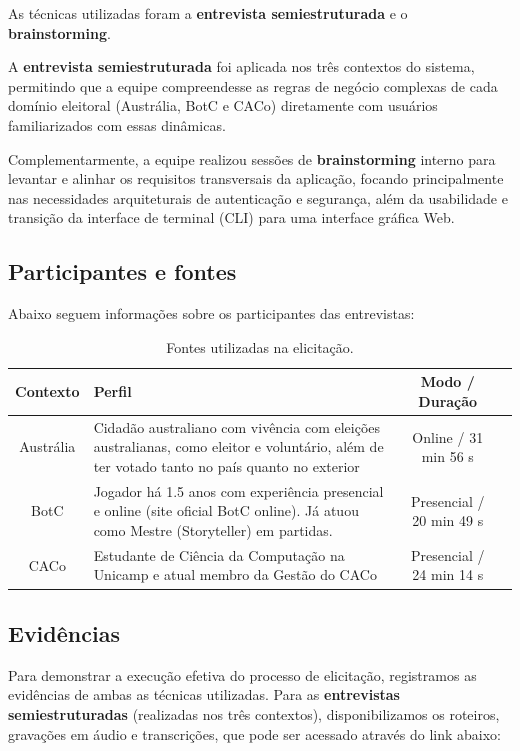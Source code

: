 \documentclass[12pt,a4paper]{article}
\begin{document}
As técnicas utilizadas foram a \textbf{entrevista semiestruturada} e o \textbf{brainstorming}. 

A \textbf{entrevista semiestruturada} foi aplicada nos três contextos do sistema, permitindo que a equipe compreendesse as regras de negócio complexas de cada domínio eleitoral (Austrália, BotC e CACo) diretamente com usuários familiarizados com essas dinâmicas. 

Complementarmente, a equipe realizou sessões de \textbf{brainstorming} interno para levantar e alinhar os requisitos transversais da aplicação, focando principalmente nas necessidades arquiteturais de autenticação e segurança, além da usabilidade e transição da interface de terminal (CLI) para uma interface gráfica Web.

\subsection{Participantes e fontes}

Abaixo seguem informações sobre os participantes das entrevistas:
\begin{table}[H]
\centering
\small
\begin{tabular}{c m{10cm} c m{8cm}}
\toprule
\textbf{Contexto} & \textbf{Perfil} & \textbf{Modo / Duração} \\
\hline

Austrália &
Cidadão australiano com vivência com eleições australianas, como eleitor e voluntário, além de ter votado tanto no país quanto no exterior &
Online / 31 min 56 s \\
\hline

BotC & 
Jogador há 1.5 anos com experiência presencial e online (site oficial BotC online). Já atuou como Mestre (Storyteller) em partidas. & 
Presencial / 20 min 49 s \\
\hline
CACo & Estudante de Ciência da Computação na Unicamp e atual membro da Gestão do CACo & Presencial / 24 min 14 s
\\


\bottomrule
\end{tabular}
\caption{Fontes utilizadas na elicitação.}
\end{table}

\subsection{Evidências}

Para demonstrar a execução efetiva do processo de elicitação, registramos as evidências de ambas as técnicas utilizadas. Para as \textbf{entrevistas semiestruturadas} (realizadas nos três contextos), disponibilizamos os roteiros, gravações em áudio e transcrições, que pode ser acessado através do link abaixo: 
\end{document}
